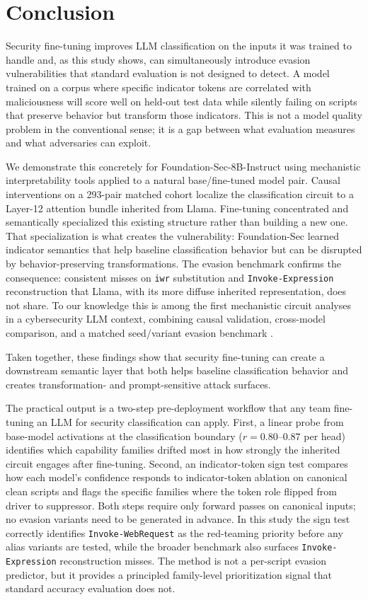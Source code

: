 \documentclass{article}
\begin{document}
\section{Conclusion}
Security fine-tuning improves LLM classification on the inputs it was trained to handle and, as this study shows, can simultaneously introduce evasion vulnerabilities that standard evaluation is not designed to detect. A model trained on a corpus where specific indicator tokens are correlated with maliciousness will score well on held-out test data while silently failing on scripts that preserve behavior but transform those indicators. This is not a model quality problem in the conventional sense; it is a gap between what evaluation measures and what adversaries can exploit.

We demonstrate this concretely for Foundation-Sec-8B-Instruct using mechanistic interpretability tools applied to a natural base/fine-tuned model pair. Causal interventions on a 293-pair matched cohort localize the classification circuit to a Layer-12 attention bundle inherited from Llama. Fine-tuning concentrated and semantically specialized this existing structure rather than building a new one. That specialization is what creates the vulnerability: Foundation-Sec learned indicator semantics that help baseline classification behavior but can be disrupted by behavior-preserving transformations. The evasion benchmark confirms the consequence: consistent misses on \texttt{iwr} substitution and \texttt{Invoke-Expression} reconstruction that Llama, with its more diffuse inherited representation, does not share. To our knowledge this is among the first mechanistic circuit analyses in a cybersecurity LLM context, combining causal validation, cross-model comparison, and a matched seed/variant evasion benchmark \citep{choi2020malicious,garciacarrasco2024detecting}.

Taken together, these findings show that security fine-tuning can create a downstream semantic layer that both helps baseline classification behavior and creates transformation- and prompt-sensitive attack surfaces.

The practical output is a two-step pre-deployment workflow that any team fine-tuning an LLM for security classification can apply. First, a linear probe from base-model activations at the classification boundary (\(r = 0.80\)--\(0.87\) per head) identifies which capability families drifted most in how strongly the inherited circuit engages after fine-tuning. Second, an indicator-token sign test compares how each model's confidence responds to indicator-token ablation on canonical clean scripts and flags the specific families where the token role flipped from driver to suppressor. Both steps require only forward passes on canonical inputs; no evasion variants need to be generated in advance. In this study the sign test correctly identifies \texttt{Invoke-WebRequest} as the red-teaming priority before any alias variants are tested, while the broader benchmark also surfaces \texttt{Invoke-Expression} reconstruction misses. The method is not a per-script evasion predictor, but it provides a principled family-level prioritization signal that standard accuracy evaluation does not.


\end{document}
